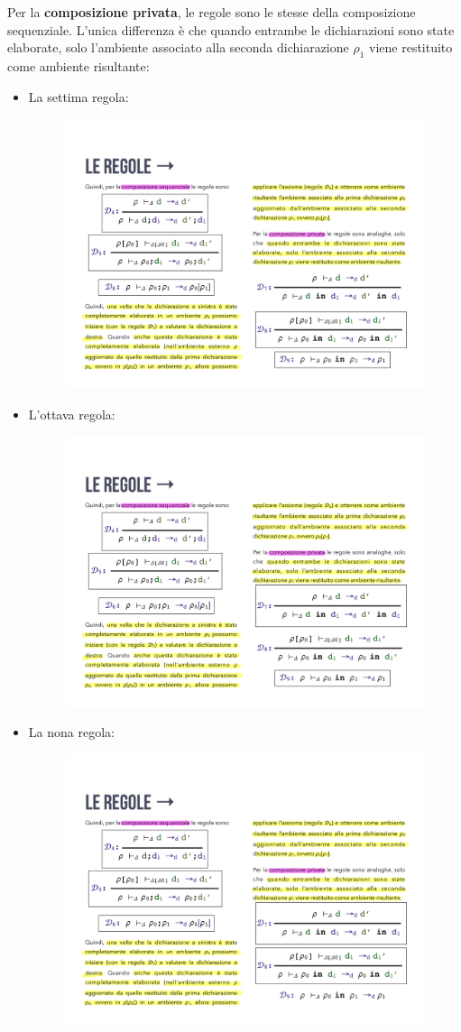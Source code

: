 \documentclass[a4paper]{article}
\begin{document}
	Per la \textbf{composizione privata}, le regole sono le stesse della composizione sequenziale. L'unica differenza è che quando entrambe le dichiarazioni sono state elaborate, solo l'ambiente associato alla seconda dichiarazione $\rho_{1}$ viene restituito come ambiente risultante:
	\begin{itemize}
		\item La settima regola:
		\begin{figure}[!htp]
			\centering
			\includegraphics[width=.6\textwidth]{img/regola_dichiarazione-7.pdf}
		\end{figure}
		
		\item L'ottava regola:
		\begin{figure}[!htp]
			\centering
			\includegraphics[width=.6\textwidth]{img/regola_dichiarazione-8.pdf}
		\end{figure}
		
		\item La nona regola:
		\begin{figure}[!htp]
			\centering
			\includegraphics[width=.5\textwidth]{img/regola_dichiarazione-9.pdf}
		\end{figure}
	\end{itemize}\newpage
	
\end{document}
